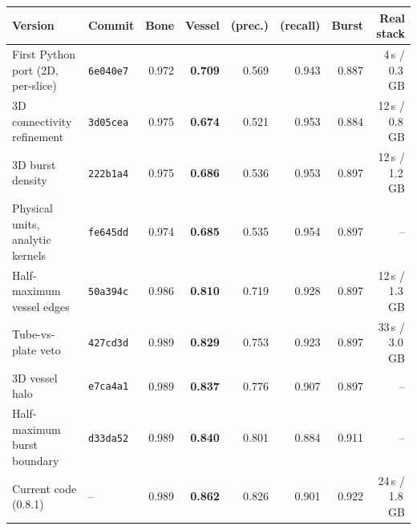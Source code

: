\begin{tabular}{@{}l l r r r r r r@{}}
\toprule
Version & Commit & Bone & Vessel & (prec.) & (recall) & Burst & Real stack \\
\midrule
First Python port (2D, per-slice) & \texttt{6e040e7} & 0.972 & \textbf{0.709} & 0.569 & 0.943 & 0.887 & 4\,s / 0.3\,GB \\
3D connectivity refinement & \texttt{3d05cea} & 0.975 & \textbf{0.674} & 0.521 & 0.953 & 0.884 & 12\,s / 0.8\,GB \\
3D burst density & \texttt{222b1a4} & 0.975 & \textbf{0.686} & 0.536 & 0.953 & 0.897 & 12\,s / 1.2\,GB \\
Physical units, analytic kernels & \texttt{fe645dd} & 0.974 & \textbf{0.685} & 0.535 & 0.954 & 0.897 & -- \\
Half-maximum vessel edges & \texttt{50a394c} & 0.986 & \textbf{0.810} & 0.719 & 0.928 & 0.897 & 12\,s / 1.3\,GB \\
Tube-vs-plate veto & \texttt{427cd3d} & 0.989 & \textbf{0.829} & 0.753 & 0.923 & 0.897 & 33\,s / 3.0\,GB \\
3D vessel halo & \texttt{e7ca4a1} & 0.989 & \textbf{0.837} & 0.776 & 0.907 & 0.897 & -- \\
Half-maximum burst boundary & \texttt{d33da52} & 0.989 & \textbf{0.840} & 0.801 & 0.884 & 0.911 & -- \\
Current code (0.8.1) & -- & 0.989 & \textbf{0.862} & 0.826 & 0.901 & 0.922 & 24\,s / 1.8\,GB \\
\bottomrule
\end{tabular}
